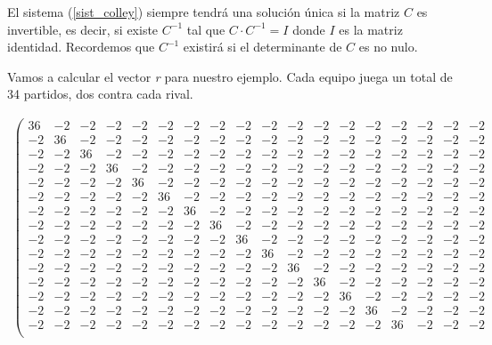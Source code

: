 El sistema (\ref{sist_colley}) siempre tendrá una solución única si la matriz $C$ es invertible, es decir, si existe $C^{-1}$ tal que $C\cdotp C^{-1} = I$ donde $I$ es la matriz identidad. Recordemos que $C^{-1}$ existirá si el determinante de $C$ es no nulo.

\begin{ejem} Vamos a calcular el vector \textit{r} para nuestro ejemplo. Cada equipo juega un total de 34 partidos, dos contra cada rival.\end{ejem}
	{\tiny \[
		\begin{array}{ccccccccccccccccccccc} 
		\left(\begin{array}{cccccccccccccccccc}
		36 & -2 & -2 & -2 & -2 & -2 & -2 & -2 & -2 & -2 & -2 & -2 & -2 & -2 & -2 & -2 & -2 & -2\\
		-2 & 36 & -2 & -2 & -2 & -2 & -2 & -2 & -2 & -2 & -2 & -2 & -2 & -2 & -2 & -2 & -2 & -2\\
		-2 & -2 & 36 & -2 & -2 & -2 & -2 & -2 & -2 & -2 & -2 & -2 & -2 & -2 & -2 & -2 & -2 & -2\\
		-2 & -2 & -2 & 36 & -2 & -2 & -2 & -2 & -2 & -2 & -2 & -2 & -2 & -2 & -2 & -2 & -2 & -2\\
		-2 & -2 & -2 & -2 & 36 & -2 & -2 & -2 & -2 & -2 & -2 & -2 & -2 & -2 & -2 & -2 & -2 & -2\\
		-2 & -2 & -2 & -2 & -2 & 36 & -2 & -2 & -2 & -2 & -2 & -2 & -2 & -2 & -2 & -2 & -2 & -2\\
		-2 & -2 & -2 & -2 & -2 & -2 & 36 & -2 & -2 & -2 & -2 & -2 & -2 & -2 & -2 & -2 & -2 & -2\\
		-2 & -2 & -2 & -2 & -2 & -2 & -2 & 36 & -2 & -2 & -2 & -2 & -2 & -2 & -2 & -2 & -2 & -2\\
		-2 & -2 & -2 & -2 & -2 & -2 & -2 & -2 & 36 & -2 & -2 & -2 & -2 & -2 & -2 & -2 & -2 & -2\\
		-2 & -2 & -2 & -2 & -2 & -2 & -2 & -2 & -2 & 36 & -2 & -2 & -2 & -2 & -2 & -2 & -2 & -2\\
		-2 & -2 & -2 & -2 & -2 & -2 & -2 & -2 & -2 & -2 & 36 & -2 & -2 & -2 & -2 & -2 & -2 & -2\\
		-2 & -2 & -2 & -2 & -2 & -2 & -2 & -2 & -2 & -2 & -2 & 36 & -2 & -2 & -2 & -2 & -2 & -2\\
		-2 & -2 & -2 & -2 & -2 & -2 & -2 & -2 & -2 & -2 & -2 & -2 & 36 & -2 & -2 & -2 & -2 & -2\\
		-2 & -2 & -2 & -2 & -2 & -2 & -2 & -2 & -2 & -2 & -2 & -2 & -2 & 36 & -2 & -2 & -2 & -2\\
		-2 & -2 & -2 & -2 & -2 & -2 & -2 & -2 & -2 & -2 & -2 & -2 & -2 & -2 & 36 & -2 & -2 & -2\\

\end{array}
\end{array}\]}
